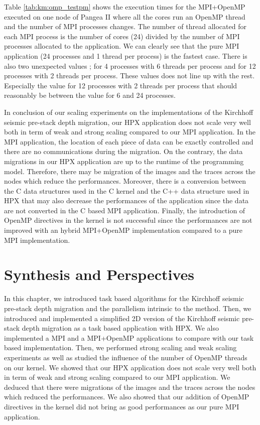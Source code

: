 Table \ref{tab:km:omp_testpm} shows the execution times for the MPI+OpenMP executed on one node of Pangea II where all the cores run an OpenMP thread and the number of MPI processes changes.
The number of thread allocated for each MPI process is the number of cores (24) divided by the number of MPI processes allocated to the application.
We can clearly see that the pure MPI application (24 processes and 1 thread per process) is the fastest case.
There is also two unexpected values ; for 4 processes with 6 threads per process and for 12 processes with 2 threads per process.
These values does not line up with the rest.
Especially the value for 12 processes with 2 threads per process that should reasonably be between the value for 6 and 24 processes.

In conclusion of our scaling experiments on the implementations of the Kirchhoff seismic pre-stack depth migration, our HPX application does not scale very well both in term of weak and strong scaling compared to our MPI application.
In the MPI application, the location of each piece of data can be exactly controlled and there are no communications during the migration.
On the contrary, the data migrations in our HPX application are up to the runtime of the programming model.
Therefore, there may be migration of the images and the traces across the nodes which reduce the performances.
Moreover, there is a conversion between the C data structures used in the C kernel and the C++ data structure used in HPX that may also decrease the performances of the application since the data are not converted in the C based MPI application.
Finally, the introduction of OpenMP directives in the kernel is not successful since the performances are not improved with an hybrid MPI+OpenMP implementation compared to a pure MPI implementation.

\section{Synthesis and Perspectives}
In this chapter, we introduced task based algorithms for the Kirchhoff seismic pre-stack depth migration and the parallelism intrinsic to the method.
Then, we introduced and implemented a simplified 2D version of the Kirchhoff seismic pre-stack depth migration as a task based application with HPX.
We also implemented a MPI and a MPI+OpenMP applications to compare with our task based implementation.
Then, we performed strong scaling and weak scaling experiments as well as studied the influence of the number of OpenMP threads on our kernel.
We showed that our HPX application does not scale very well both in term of weak and strong scaling compared to our MPI application.
We deduced that there were migrations of the images and the traces across the nodes which reduced the performances.
We also showed that our addition of OpenMP directives in the kernel did not bring as good performances as our pure MPI application.

